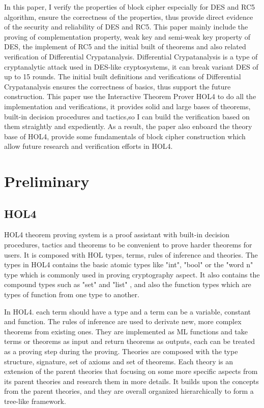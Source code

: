 \documentclass{article}
\begin{document}
In this paper, I verify the properties
of block cipher especially for DES and RC5 algorithm, ensure the correctness of the properties, thus provide
direct evidence of the security and reliability of DES and RC5. This paper mainly include the proving of
complementation property,
weak key and semi-weak key property of DES, the implement of RC5 and the initial built of theorems and also related verification
of Differential Crypatanalysis. Differential Crypatanalysis is a type of cryptanalytic attack used in DES-like
cryptosystems, it can break variant DES of up to 15 rounds. The initial built definitions and verifications of
Differential Crypatanalysis ensures the correctness of basics, thus support the future construction. This paper
use the Interactive Theorem Prover HOL4 to do all the implementation and verifications, it provides solid and
large bases of theorems, built-in decision procedures and tactics,so I can build the verification based on them
straightly and expediently. As a result, the paper also enboard the theory base of HOL4, provide some
fundamentals of block cipher construction which allow future research and verification efforts in HOL4.

\section{Preliminary}
\subsection{HOL4}
HOL4 theorem proving system is a proof assistant with built-in decision procedures, tactics and theorems to
be convenient to prove harder theorems for users. It is composed with HOL types, terms, rules of inference
and theories. The types in HOL4 contains the basic atomic types like "int", "bool" or the "word n" type which
is commonly used in proving cryptography aspect. It also contains the compound types such as "set" and "list"
, and also the function types which are types of function from one type to another.

In HOL4. each term should
have a type and a term can be a variable, constant and function. The rules of inference are used to derivate
new, more complex theorems from existing ones. They are implemented as ML functions and take terms or theorems
as input and return theorems as outputs, each can be treated as a proving step during the proving. Theories are
composed with the type structure, signature, set of axioms and set of theorems. Each theory is an extension of
the parent theories that focusing on some more specific aspects from its parent theories and research them in
more details. It builds upon the concepts from the parent theories, and they are overall organized hierarchically
to form a tree-like framework.
\end{document}
